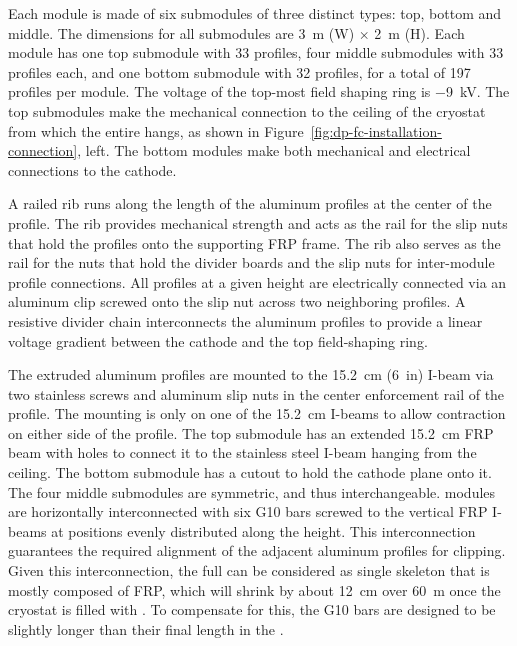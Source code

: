 Each  module is made of six submodules of three distinct types: top, bottom and middle. The dimensions for all submodules are \SI{3}{\m} (W) $\times$ \SI{2}{\m} (H).
Each module has one top submodule with \num{33} profiles, four middle submodules with \num{33} profiles each, and one bottom submodule with \num{32} profiles, for a total of \num{197} profiles per module. The voltage of the top-most field shaping ring  is \SI{-9}{\kV}. 
The top submodules make the mechanical connection to the ceiling of the cryostat from which the entire  hangs, as shown in Figure~\ref{fig:dp-fc-installation-connection}, left. The bottom modules make both mechanical and electrical connections to the cathode. 


A railed rib runs along the length of the aluminum profiles at the center of the profile.  The rib provides mechanical strength and acts as the rail for the slip nuts that hold the profiles onto the supporting FRP frame. The rib also serves as the rail for the nuts that hold the  divider boards and the slip nuts for inter-module profile connections.  
All profiles at a given height are electrically connected via an aluminum clip screwed onto the slip nut across two neighboring profiles.  A resistive divider chain interconnects the aluminum profiles to provide a linear voltage gradient between the cathode and the top field-shaping ring.   


The extruded aluminum profiles are mounted to the \SI{15.2}{\cm} (\SI{6}{in}) I-beam via two stainless screws and aluminum slip nuts in the center enforcement rail of the profile. The mounting is only on one of the \SI{15.2}{\cm} I-beams to allow contraction on either side of the profile. The top submodule has an extended \SI{15.2}{\cm} FRP beam with holes to connect it to the stainless steel I-beam hanging from the ceiling.  The bottom submodule has a cutout to hold the cathode plane onto it. The four middle submodules are symmetric, and thus interchangeable.
%
 modules are horizontally interconnected with six G10 bars screwed to the vertical FRP I-beams at positions evenly distributed along the \tpcheight height. This interconnection guarantees the required alignment of the adjacent aluminum profiles for clipping. Given this interconnection, the full  can be considered as single skeleton that is mostly composed of FRP, which will shrink by about \SI{12}{cm} over \SI{60}{m} once the cryostat is filled with \lar. %
To compensate for this, the G10 bars are designed to be slightly longer than their final length in the \lar.


